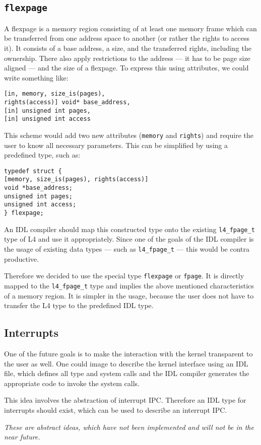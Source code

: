 \subsection{\tt flexpage}
\label{sec:flexpage}
A flexpage is a memory region consisting of at least one 
memory frame which can be transferred from one address space
to another (or rather the rights to access it). It consists
of a base address, a size, and the transferred rights, including
the ownership. There also apply restrictions to the address ---
it has to be page size aligned --- and the size of a flexpage.
To express this using attributes, we could write
something like:
\begin{verbatim}
[in, memory, size_is(pages), 
rights(access)] void* base_address, 
[in] unsigned int pages,
[in] unsigned int access
\end{verbatim}
This scheme would add two new attributes (\verb|memory| and
\verb|rights|) and require the user to know all necessary
parameters. This can be simplified by using a predefined 
type, such as:
\begin{verbatim}
typedef struct {
[memory, size_is(pages), rights(access)]
void *base_address;
unsigned int pages;
unsigned int access;
} flexpage;
\end{verbatim}
An IDL compiler should map this constructed type 
onto the existing \verb|l4_fpage_t| type of L4 and use it
appropriately.
Since one of the goals of the IDL compiler is the usage of 
existing data types --- such as \verb|l4_fpage_t| --- this would
be contra productive.

Therefore we decided to use the special type \verb|flexpage| or
\verb|fpage|. It is directly mapped to the \verb|l4_fpage_t| type
and implies the above mentioned characteristics of a memory
region. It is simpler in the usage, because the user does
not have to transfer the L4 type to the predefined IDL type.


\subsection{Interrupts}
One of the future goals is to make the interaction with the
kernel transparent to the user as well. One could image to
describe the kernel interface using an IDL file, which defines
all type and system calls and the IDL compiler generates the
appropriate code to invoke the system calls.

This idea involves the abstraction of interrupt IPC. Therefore
an IDL type for interrupts should exist, which can be used to
describe an interrupt IPC.

{\it These are abstract ideas, which have not been implemented
and will not be in the near future.}

